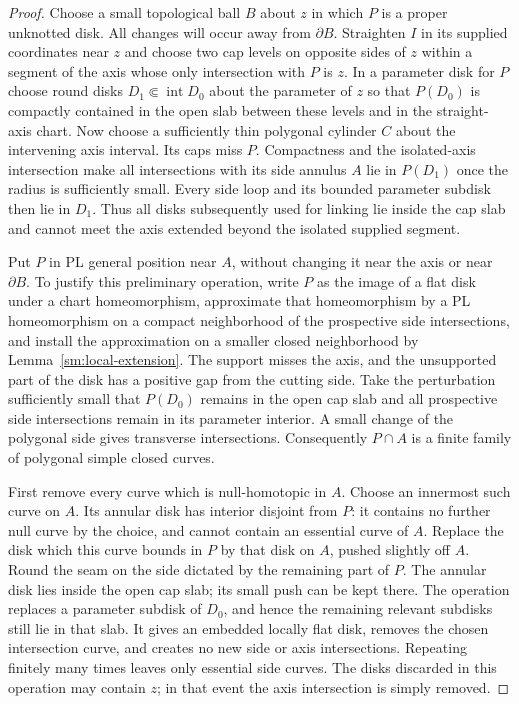 \documentclass[11pt]{article}
\numberwithin{equation}{section}
\theoremstyle{definition}
\theoremstyle{remark}
\begin{document}
\begin{proof}
Choose a small topological ball $B$ about $z$ in which $P$ is a proper
unknotted disk.  All changes will occur away from $\partial B$.
Straighten $I$ in its supplied coordinates near $z$ and choose two
cap levels on opposite sides of $z$ within a segment of the axis whose
only intersection with $P$ is $z$.  In a parameter disk for $P$ choose
round disks $D_1\Subset\operatorname{int}D_0$ about the parameter of
$z$ so that $P(D_0)$ is compactly contained in the open slab between
these levels and in the straight-axis chart.  Now choose a sufficiently
thin polygonal cylinder $C$ about the intervening axis interval.  Its
caps miss $P$.  Compactness and the isolated-axis intersection make
all intersections with its side annulus $A$ lie in $P(D_1)$ once
the radius is sufficiently small.  Every side loop and its bounded
parameter subdisk then lie in $D_1$.  Thus all disks subsequently used
for linking lie inside the cap slab and cannot meet the axis extended
beyond the isolated supplied segment.

Put $P$ in PL general position near $A$, without changing it near the
axis or near $\partial B$.  To justify this preliminary operation,
write $P$ as the image of a flat disk under a chart homeomorphism,
approximate that homeomorphism by a PL homeomorphism on a compact
neighborhood of the prospective side intersections, and install the
approximation on a smaller closed neighborhood by
Lemma~\ref{sm:local-extension}.  The support misses the axis, and the
unsupported part of the disk has a positive gap from the cutting side.
Take the perturbation sufficiently small that $P(D_0)$ remains in
the open cap slab and all prospective side intersections remain in
its parameter interior.  A small change of the polygonal side gives
transverse intersections.
Consequently $P\cap A$ is a finite family of polygonal simple closed
curves.

First remove every curve which is null-homotopic in $A$.  Choose an
innermost such curve on $A$.  Its annular disk has interior disjoint
from $P$: it contains no further null curve by the choice, and cannot
contain an essential curve of $A$.  Replace the disk which this curve
bounds in $P$ by that disk on $A$, pushed slightly off $A$.  Round the
seam on the side dictated by the remaining part of $P$.  The annular
disk lies inside the open cap slab; its small push can be kept there.
The operation replaces a parameter subdisk of $D_0$, and hence the
remaining relevant subdisks still lie in that slab.  It gives an
embedded locally flat disk, removes the chosen intersection curve, and
creates no new side or axis intersections.  Repeating finitely many
times leaves only essential side curves.  The disks discarded in this
operation may contain $z$; in that event the axis intersection is simply
removed.


\end{proof}
\end{document}

